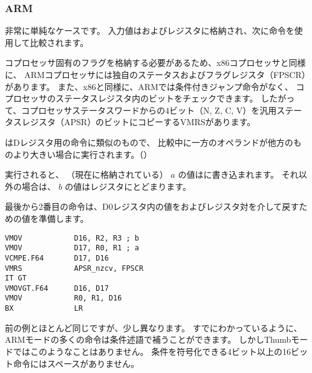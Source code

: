 \subsubsection{ARM}

\myparagraph{\OptimizingXcodeIV (\ARMMode)}



非常に単純なケースです。
入力値はおよびレジスタに格納され、次に命令を使用して比較されます。

コプロセッサ固有のフラグを格納する必要があるため、x86コプロセッサと同様に、
ARMコプロセッサには独自のステータスおよびフラグレジスタ（\ac{FPSCR}）があります。 
また、x86と同様に、ARMでは条件付きジャンプ命令がなく、
コプロセッサのステータスレジスタ内のビットをチェックできます。 
したがって、コプロセッサステータスワードからの4ビット（N, Z, C, V）を汎用ステータスレジスタ（\ac{APSR}）のビットにコピーするVMRSがあります。

はDレジスタ用の命令に類似のもので、
比較中に一方のオペランドが他方のものより大きい場合に実行されます。（）

実行されると、 （現在に格納されている） $a$ の値はに書き込まれます。 
それ以外の場合は、 $b$ の値はレジスタにとどまります。


最後から2番目の命令は、D0レジスタ内の値をおよびレジスタ対を介して戻すための値を準備します。

\myparagraph{\OptimizingXcodeIV (\ThumbTwoMode)}

\begin{lstlisting}[caption=\OptimizingXcodeIV (\ThumbTwoMode),style=customasmARM]
VMOV            D16, R2, R3 ; b
VMOV            D17, R0, R1 ; a
VCMPE.F64       D17, D16
VMRS            APSR_nzcv, FPSCR
IT GT 
VMOVGT.F64      D16, D17
VMOV            R0, R1, D16
BX              LR
\end{lstlisting}

前の例とほとんど同じですが、少し異なります。 
すでにわかっているように、ARMモードの多くの命令は条件述語で補うことができます。 
しかしThumbモードではこのようなことはありません。 
条件を符号化できる4ビット以上の16ビット命令にはスペースがありません。

